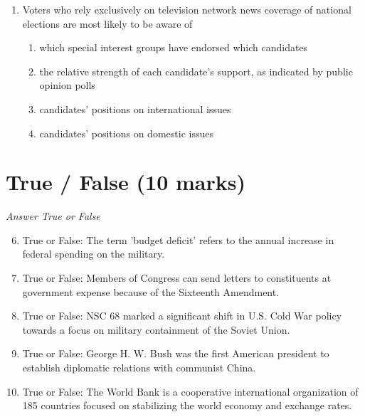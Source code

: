 \documentclass[12pt]{article}
\begin{document}
\begin{enumerate}[label=\arabic*.]
\begin{enumerate}[label=(\alph*)]
    \item Moving the Department of Defense Intelligence Agencies to the CIA for better coordination
    \item Creation of the National Intelligence Director
    \item Moving the domestic intelligence component of the FBI to the CIA
\end{enumerate}
\item Voters who rely exclusively on television network news coverage of national elections are most likely to be aware of
\begin{enumerate}[label=(\alph*)]
    \item which special interest groups have endorsed which candidates
    \item the relative strength of each candidate's support, as indicated by public opinion polls
    \item candidates' positions on international issues
    \item candidates' positions on domestic issues
\end{enumerate}
\end{enumerate}

\section*{True / False (10 marks)}
\textit{Answer True or False}
\begin{enumerate}[label=\arabic*.]
\setcounter{enumi}{5}
\item True or False: The term 'budget deficit' refers to the annual increase in federal spending on the military.
\item True or False: Members of Congress can send letters to constituents at government expense because of the Sixteenth Amendment.
\item True or False: NSC 68 marked a significant shift in U.S. Cold War policy towards a focus on military containment of the Soviet Union.
\item True or False: George H. W. Bush was the first American president to establish diplomatic relations with communist China.
\item True or False: The World Bank is a cooperative international organization of 185 countries focused on stabilizing the world economy and exchange rates.
\end{enumerate}
\end{document}

